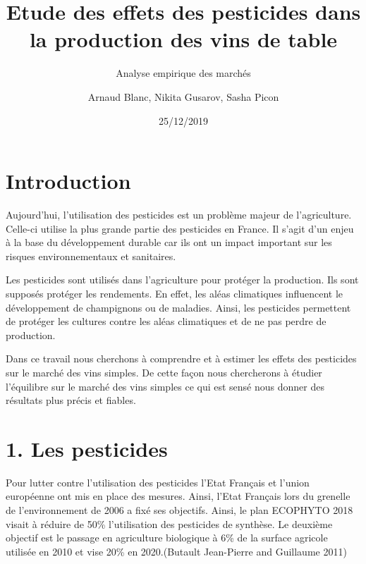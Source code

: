\documentclass[11pt,]{article}
\title{Etude des effets des pesticides dans la production des vins de table}
\subtitle{Analyse empirique des marchés}
\author{Arnaud Blanc, Nikita Gusarov, Sasha Picon}
\date{25/12/2019}
\begin{document}
\maketitle


\hypersetup{linkcolor = black}

\tableofcontents





\newpage

\hypersetup{linkcolor = blue}

\hypertarget{introduction}{%
\section{Introduction}\label{introduction}}

Aujourd'hui, l'utilisation des pesticides est un problème majeur de
l'agriculture. Celle-ci utilise la plus grande partie des pesticides en
France. Il s'agit d'un enjeu à la base du développement durable car ils
ont un impact important sur les risques environnementaux et sanitaires.

Les pesticides sont utilisés dans l'agriculture pour protéger la
production. Ils sont supposés protéger les rendements. En effet, les
aléas climatiques influencent le développement de champignons ou de
maladies. Ainsi, les pesticides permettent de protéger les cultures
contre les aléas climatiques et de ne pas perdre de production.

Dans ce travail nous cherchons à comprendre et à estimer les effets des
pesticides sur le marché des vins simples. De cette façon nous
chercherons à étudier l'équilibre sur le marché des vins simples ce qui
est sensé nous donner des résultats plus précis et fiables.

\hypertarget{les-pesticides}{%
\section{1. Les pesticides}\label{les-pesticides}}

Pour lutter contre l'utilisation des pesticides l'Etat Français et
l'union européenne ont mis en place des mesures. Ainsi, l'Etat Français
lors du grenelle de l'environnement de 2006 a fixé ses objectifs. Ainsi,
le plan ECOPHYTO 2018 visait à réduire de 50\% l'utilisation des
pesticides de synthèse. Le deuxième objectif est le passage en
agriculture biologique à 6\% de la surface agricole utilisée en 2010 et
vise 20\% en 2020.(Butault Jean-Pierre and Guillaume 2011)
\end{document}
